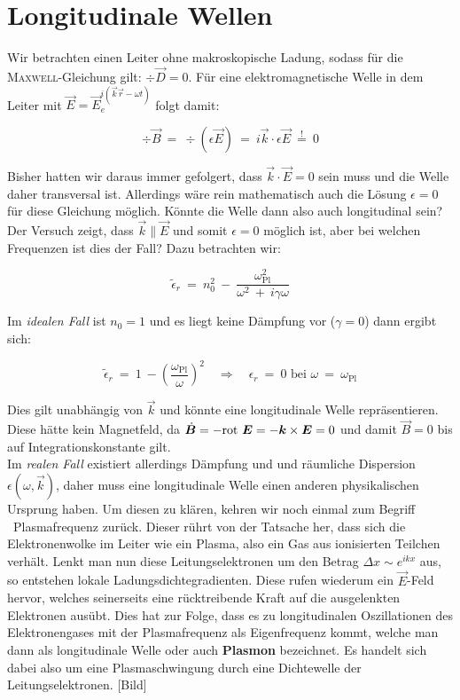 \section{Longitudinale Wellen}

Wir betrachten einen Leiter ohne makroskopische Ladung, sodass für die \textsc{Maxwell}-Gleichung gilt: $\div\vec{D}=0$. Für eine elektromagnetische Welle in dem Leiter mit $\vec{E}=\vec{E}_ e^{i(\vec{k}\vec{r}-\omega t)}$ folgt damit:

\begin{equation*}
\div \vec{B} \ = \ \div(\epsilon\vec{E})  \ = \ i\vec{k}\cdot \epsilon\vec{E} \ \overset{!}{=} \ 0
\end{equation*}

Bisher hatten wir daraus immer gefolgert, dass $\vec{k}\cdot\vec{E}=0$ sein muss und die Welle daher transversal ist. Allerdings wäre rein mathematisch auch die Lösung $\epsilon=0$ für diese Gleichung möglich. Könnte die Welle dann also auch longitudinal sein?\\
Der Versuch zeigt, dass $\vec{k}\parallel\vec{E}$ und somit $\epsilon =0$ möglich ist, aber bei welchen Frequenzen ist dies der Fall? Dazu betrachten wir:


\begin{equation*}
\tilde{\epsilon}_r  \ = \ n_0^2 \ - \ \frac{\omega_{\text{Pl}}^2}{\omega^2 \ + \ i \gamma\omega}
\end{equation*}

Im \emph{idealen Fall} ist $n_0=1$ und es liegt keine Dämpfung vor ($\gamma=0$) dann ergibt sich:

\begin{equation*}
\tilde{\epsilon}_r \ = \ 1 \ - \left(\frac{\omega_{\text{Pl}}}{\omega}\right)^2 \quad\Rightarrow\quad \epsilon_r \ = \ 0 \text{ bei } \omega \ = \ \omega_{\text{Pl}}
\end{equation*}

Dies gilt unabhängig von $\vec{k}$ und könnte eine longitudinale Welle repräsentieren. Diese hätte kein Magnetfeld, da $\dot{\bm{B}}= - \text{rot }\bm{E} = - \bm{k}\times\bm{E}= 0$ und damit $\vec{B}=0$ bis auf Integrationskonstante gilt.\\
Im \emph{realen Fall} existiert allerdings Dämpfung und und räumliche Dispersion $\epsilon(\omega,\vec{k})$, daher muss eine longitudinale Welle einen anderen physikalischen Ursprung haben. Um diesen zu klären, kehren wir noch einmal zum Begriff \ \grqq Plasmafrequenz\grqq{}  zurück.  Dieser rührt von der Tatsache her, dass sich die Elektronenwolke im Leiter wie ein Plasma, also ein Gas aus ionisierten Teilchen verhält. Lenkt man nun diese Leitungselektronen um den Betrag $\Delta x \sim e^{ikx}$ aus, so entstehen lokale Ladungsdichtegradienten. Diese rufen wiederum ein $\vec{E}$-Feld hervor, welches seinerseits eine rücktreibende Kraft auf die ausgelenkten Elektronen ausübt. Dies hat zur Folge, dass es zu longitudinalen Oszillationen des Elektronengases mit der Plasmafrequenz als Eigenfrequenz kommt, welche man dann als \grqq longitudinale Welle\grqq{} oder auch \textbf{\grqq Plasmon\grqq{}} bezeichnet.  Es handelt sich dabei also um eine Plasmaschwingung durch eine Dichtewelle der Leitungselektronen.
[Bild]


